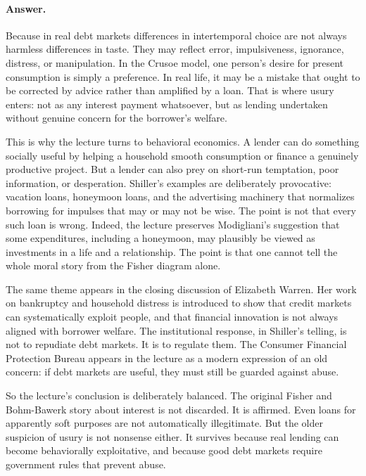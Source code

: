 \paragraph{Answer.} Because in real debt markets differences in intertemporal choice are not always harmless differences in taste. They may reflect error, impulsiveness, ignorance, distress, or manipulation. In the Crusoe model, one person's desire for present consumption is simply a preference. In real life, it may be a mistake that ought to be corrected by advice rather than amplified by a loan. That is where usury enters: not as any interest payment whatsoever, but as lending undertaken without genuine concern for the borrower's welfare.

This is why the lecture turns to behavioral economics. A lender can do something socially useful by helping a household smooth consumption or finance a genuinely productive project. But a lender can also prey on short-run temptation, poor information, or desperation. Shiller's examples are deliberately provocative: vacation loans, honeymoon loans, and the advertising machinery that normalizes borrowing for impulses that may or may not be wise. The point is not that every such loan is wrong. Indeed, the lecture preserves Modigliani's suggestion that some expenditures, including a honeymoon, may plausibly be viewed as investments in a life and a relationship. The point is that one cannot tell the whole moral story from the Fisher diagram alone.

The same theme appears in the closing discussion of Elizabeth Warren. Her work on bankruptcy and household distress is introduced to show that credit markets can systematically exploit people, and that financial innovation is not always aligned with borrower welfare. The institutional response, in Shiller's telling, is not to repudiate debt markets. It is to regulate them. The Consumer Financial Protection Bureau appears in the lecture as a modern expression of an old concern: if debt markets are useful, they must still be guarded against abuse.

So the lecture's conclusion is deliberately balanced. The original Fisher and Bohm-Bawerk story about interest is not discarded. It is affirmed. Even loans for apparently soft purposes are not automatically illegitimate. But the older suspicion of usury is not nonsense either. It survives because real lending can become behaviorally exploitative, and because good debt markets require government rules that prevent abuse.

